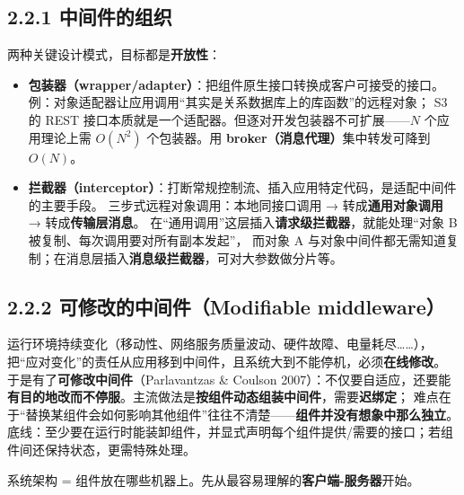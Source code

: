\subsection*{2.2.1 中间件的组织}
两种关键设计模式，目标都是\textbf{开放性}：
\begin{itemize}
  \item \textbf{包装器（wrapper/adapter）}：把组件原生接口转换成客户可接受的接口。
        例：对象适配器让应用调用“其实是关系数据库上的库函数”的远程对象；
        S3 的 REST 接口本质就是一个适配器。但逐对开发包装器不可扩展——$N$ 个应用理论上需
        $O(N^2)$ 个包装器。用 \textbf{broker（消息代理）}集中转发可降到 $O(N)$。
  \item \textbf{拦截器（interceptor）}：打断常规控制流、插入应用特定代码，是适配中间件的主要手段。
        三步式远程对象调用：本地同接口调用 → 转成\textbf{通用对象调用} → 转成\textbf{传输层消息}。
        在“通用调用”这层插入\textbf{请求级拦截器}，就能处理“对象 B 被复制、每次调用要对所有副本发起”，
        而对象 A 与对象中间件都无需知道复制；在消息层插入\textbf{消息级拦截器}，可对大参数做分片等。
\end{itemize}

\begin{closeread}
\end{closeread}

\subsection*{2.2.2 可修改的中间件（Modifiable middleware）}
运行环境持续变化（移动性、网络服务质量波动、硬件故障、电量耗尽……），
把“应对变化”的责任从应用移到中间件，且系统大到不能停机，必须\textbf{在线修改}。
于是有了\textbf{可修改中间件}（Parlavantzas \& Coulson 2007）：不仅要自适应，还要能
\textbf{有目的地改而不停服}。主流做法是\textbf{按组件动态组装中间件}，需要\textbf{迟绑定}；
难点在于“替换某组件会如何影响其他组件”往往不清楚——\textbf{组件并没有想象中那么独立}。
底线：至少要在运行时能装卸组件，并显式声明每个组件提供/需要的接口；若组件间还保持状态，更需特殊处理。



系统架构 = 组件放在哪些机器上。先从最容易理解的\textbf{客户端-服务器}开始。

